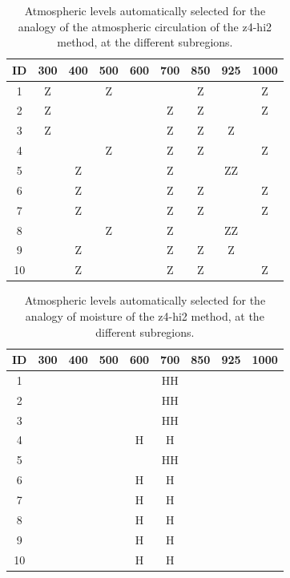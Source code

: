 \documentclass[twocol]{ametsoc}
\begin{document}
\begin{table}[htbp]
	\footnotesize
	\caption{Atmospheric levels automatically selected for the analogy of the atmospheric circulation of the z4-hi2 method, at the different subregions.}
	\begin{center}
		\begin{tabular}{ccccccccc}
			\hline \textbf{ID} & \textbf{300} & \textbf{400} & \textbf{500} & \textbf{600} & \textbf{700} & \textbf{850} & \textbf{925} & \textbf{1000} \\ 
			\hline 
			1  & Z &   & Z &   &   & Z &   & Z \\
			2  & Z &   &   &   & Z & Z &   & Z \\
			3  & Z &   &   &   & Z & Z & Z &   \\
			4  &   &   & Z &   & Z & Z &   & Z \\
			5  &   & Z &   &   & Z &   & ZZ &   \\
			6  &   & Z &   &   & Z & Z &   & Z \\
			7  &   & Z &   &   & Z & Z &   & Z \\
			8  &   &   & Z &   & Z &   & ZZ &   \\
			9  &   & Z &   &   & Z & Z & Z &   \\
			10 &   & Z &   &   & Z & Z &   & Z \\
			\hline 
		\end{tabular} 
	\end{center}
	\label{table:levels_GA_z4_hi2}
\end{table}

\begin{table}[htbp]
	\footnotesize
	\caption{Atmospheric levels automatically selected for the analogy of moisture of the z4-hi2 method, at the different subregions.}
	\begin{center}
		\begin{tabular}{ccccccccc}
			\hline \textbf{ID} & \textbf{300} & \textbf{400} & \textbf{500} & \textbf{600} & \textbf{700} & \textbf{850} & \textbf{925} & \textbf{1000} \\ 
			\hline 
			1  &   &   &   &   & HH &   &   &   \\
			2  &   &   &   &   & HH &   &   &   \\
			3  &   &   &   &   & HH &   &   &   \\
			4  &   &   &   & H & H &   &   &   \\
			5  &   &   &   &   & HH &   &   &   \\
			6  &   &   &   & H & H &   &   &   \\
			7  &   &   &   & H & H &   &   &   \\
			8  &   &   &   & H & H &   &   &   \\
			9  &   &   &   & H & H &   &   &   \\
			10 &   &   &   & H & H &   &   &   \\
			\hline 
		\end{tabular} 
	\end{center}
	\label{table:levels_GA_z4_hi2_H}
\end{table}
\end{document}
